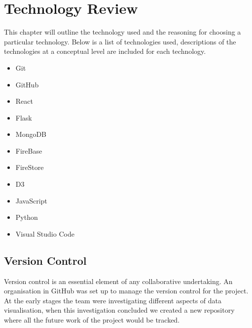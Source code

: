 \chapter{Technology Review}
This chapter will outline the technology used and the reasoning for choosing a particular technology. Below is a list of technologies used, descriptions of the technologies at a conceptual level are included for each technology. 
\begin{itemize}
\item Git
\item GitHub
\item React
\item Flask
\item MongoDB
\item FireBase
\item FireStore
\item D3
\item JavaScript
\item Python
\item Visual Studio Code


\end{itemize}

\section{Version Control}
Version control is an essential element of any collaborative undertaking. An organisation in GitHub was set up to manage the version control for the project. At the early stages the team were investigating different aspects of data visualisation, when this investigation concluded we created a new repository where all the future work of the project would be tracked.
